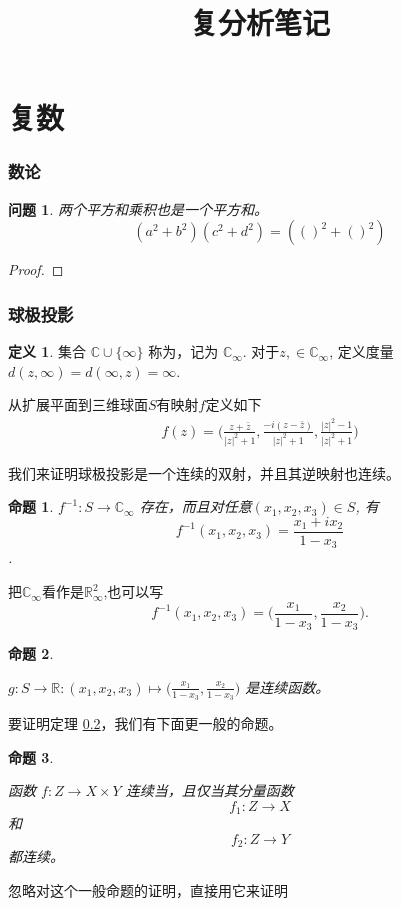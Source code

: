 \documentclass{ctexart}
\title{复分析笔记}
\newtheorem{question}{问题} %
\newtheorem{prop}{命题}[section]
\theoremstyle{definition}
\newtheorem{Definition}{定义}[section]
\newcommand{\R}{\mathbb{R}}
\newcommand{\vocab}[1]{{\color{red}{\textit{#1}}}}
\begin{document}
\tableofcontents 

\part{复数}
\section*{数论}
\begin{question} 两个平方和乘积也是一个平方和。 \[(a^2+b^2)(c^2+d^2)=(()^2+()^2)\] 
 \end{question}
\begin{proof}  \end{proof}
\section*{球极投影}
\begin{Definition}{} 集合
    \(\mathbb{C}\cup \{\infty \}\) 称为\vocab{扩展复平面}，记为
    \(\mathbb{C}_{\infty}\). 对于$z,\in \mathbb{C}_{\infty}$, 定义度量 \(d(z,\infty)=d(\infty,z)=\infty\).  
\end{Definition}
从扩展平面到三维球面\(S\)有映射\(f\)定义如下
\begin{align}
    f(z)=\bigg(\frac{z+\bar{z}}{|z|^2+1} , \frac{-i(z-\bar{z})}{|z|^2+1}, \frac{|z|^2-1}{|z|^2+1}\bigg)
\end{align}


我们来证明球极投影是一个连续的双射，并且其逆映射也连续。

\begin{prop}{}
    \(f^{-1}\colon S\to \mathbb{C}_{\infty}\) 存在，而且对任意\((x_1,x_2,x_3)\in S\), 有\[f^{-1}(x_1,x_2,x_3)=\frac{x_1+ix_2}{1-x_3}\]. 
\end{prop}
把\(\mathbb{C}_{\infty}\)看作是\(\R^2_{\infty}\),也可以写 \[ f^{-1}(x_1,x_2,x_3)=\bigl( \frac{x_1}{1-x_3},\frac{x_2}{1-x_3} \bigl). \]
\begin{prop}\hypertarget{02}{}
    \(g\colon S\to \mathbb{R}\colon (x_1,x_2,x_3) \mapsto \bigl( \frac{x_1}{1-x_3},\frac{x_2}{1-x_3} \bigl) \) 是连续函数。
    
\end{prop}   
要证明定理 \hyperlink{02}{0.2}，我们有下面更一般的命题。
\begin{prop}\hypertarget{03}{}
    函数 \(f\colon Z\to X\times Y\) 连续当，且仅当其分量函数\[f_1\colon Z\to X\] 和 \[f_2\colon Z\to Y\] 都连续。 
\end{prop}
忽略对这个一般命题的证明，直接用它来证明
\end{document}
